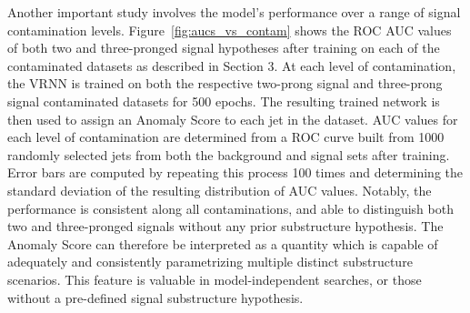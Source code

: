 \documentclass[12pt, a4paper]{article}
\begin{document}



Another important study involves the model's performance over a range of signal contamination
levels. Figure~\ref{fig:aucs_vs_contam} shows the ROC AUC values of both two and three-pronged signal hypotheses
after training on each of the contaminated datasets as described in Section 3. 
At each level of contamination, the VRNN is trained on both the respective two-prong signal and three-prong signal contaminated datasets for 500 epochs. 
The resulting trained network is then used to assign an Anomaly Score to each jet in the dataset. 
AUC values for each level of contamination are determined from a ROC curve built from 1000 randomly selected jets from both the background and signal sets after training.
Error bars are computed by repeating this process 100 times and determining the standard deviation of the resulting distribution of AUC values.
Notably, the performance is consistent along all contaminations, and able to distinguish both two and three-pronged signals without any prior substructure hypothesis. 
The Anomaly Score can therefore be interpreted as a quantity which is capable of adequately and consistently parametrizing multiple distinct substructure scenarios. 
This feature is valuable in model-independent searches, or those without a pre-defined signal substructure hypothesis. 
\end{document}
